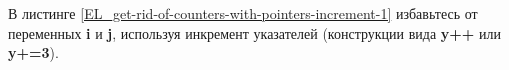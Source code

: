 В листинге \ref{EL_get-rid-of-counters-with-pointers-increment-1} избавьтесь от переменных
\textbf{i} и \textbf{j}, используя инкремент указателей
(конструкции вида \textbf{y++} или \textbf{y+=3}).
